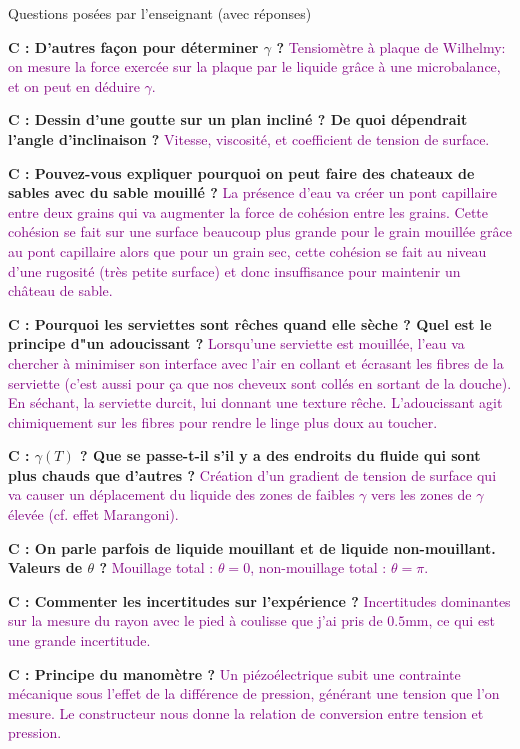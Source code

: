 \begin{reportBlock}{Questions posées par l’enseignant (avec réponses)}
  
  \textbf{C : D'autres façon pour déterminer $\gamma$ ?} \textcolor{purple}{Tensiomètre à plaque de Wilhelmy: on mesure la force exercée sur la plaque par le liquide grâce à une microbalance, et on peut en déduire $\gamma$.}

  
  \textbf{C : Dessin d'une goutte sur un plan incliné ? De quoi dépendrait l'angle d'inclinaison ?} \textcolor{purple}{Vitesse, viscosité, et coefficient de tension de surface.}

  
  \textbf{C : Pouvez-vous expliquer pourquoi on peut faire des chateaux de sables avec du sable mouillé ?} \textcolor{purple}{La présence d'eau va créer un pont capillaire entre deux grains qui va augmenter la force de cohésion entre les grains. Cette cohésion se fait sur une surface beaucoup plus grande pour le grain mouillée grâce au pont capillaire alors que pour un grain sec, cette cohésion se fait au niveau d'une rugosité (très petite surface) et donc insuffisance pour maintenir un château de sable.}



  \textbf{C : Pourquoi les serviettes sont rêches quand elle sèche ? Quel est le principe d"un adoucissant ?} \textcolor{purple}{Lorsqu'une serviette est mouillée, l'eau va chercher à minimiser son interface avec l'air en collant et écrasant les fibres de la serviette (c'est aussi pour ça que nos cheveux sont collés en sortant de la douche). En séchant, la serviette durcit, lui donnant une texture rêche. L'adoucissant agit chimiquement sur les fibres pour rendre le linge plus doux au toucher.}


  \textbf{C : $\gamma(T)$ ? Que se passe-t-il s'il y a des endroits du fluide qui sont plus chauds que d'autres ?} \textcolor{purple}{Création d'un gradient de tension de surface qui va causer un déplacement du liquide des zones de faibles $\gamma$ vers les zones de $\gamma$ élevée (cf. effet Marangoni).}

  
  \textbf{C : On parle parfois de liquide mouillant et de liquide non-mouillant. Valeurs de $\theta$ ?} \textcolor{purple}{Mouillage total : $\theta=0$, non-mouillage total : $\theta=\pi$.}

  
  \textbf{C : Commenter les incertitudes sur l'expérience ?} \textcolor{purple}{Incertitudes dominantes sur la mesure du rayon avec le pied à coulisse que j'ai pris de $0.5$mm, ce qui est une grande incertitude.}


  \textbf{C : Principe du manomètre ?} \textcolor{purple}{Un piézoélectrique subit une contrainte mécanique sous l'effet de la différence de pression, générant une tension que l'on mesure. Le constructeur nous donne la relation de conversion entre tension et pression.}

  \end{reportBlock}
  

